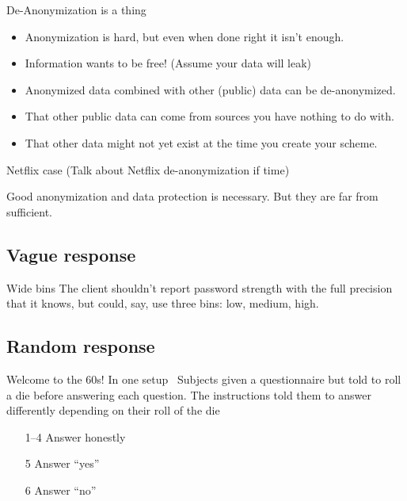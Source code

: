 \documentclass[xcolor={dvipsnames,table,hyperref}]{beamer}
\begin{document}
\begin{frame}{De-Anonymization is a thing}
  \begin{itemize}
    \item Anonymization is hard, but even when done right it isn't enough.
    \item Information wants to be free! (Assume your data will leak)
    \item Anonymized data combined with other (public) data can be de-anonymized.
    \item That other public data can come from sources you have nothing to do with.
    \item That other data might not yet exist at the time you create your scheme.
  \end{itemize}
\end{frame}

\begin{frame}{Netflix case}
  (Talk about Netflix de-anonymization if time)
\end{frame}

\begin{frame}[standout]
  Good anonymization and data protection is necessary. But they are far from sufficient.
\end{frame}

\subsection{Vague response}

\begin{frame}{Wide bins}
  The client shouldn't report password strength with the full precision that it knows,
  but could, say, use three bins: low, medium, high.
\end{frame}

\subsection{Random response}

\begin{frame}{Welcome to the 60s!}
  In one setup~\cite{BBB:JoP79} Subjects given a questionnaire but told to roll a die before answering each question.
  The instructions told them to answer differently depending on their roll of the die
  \begin{itemize}
    \item[1--4] Answer honestly
    \item[5] Answer “yes”
    \item[6] Answer “no”
  \end{itemize}
\end{frame}
\end{document}
